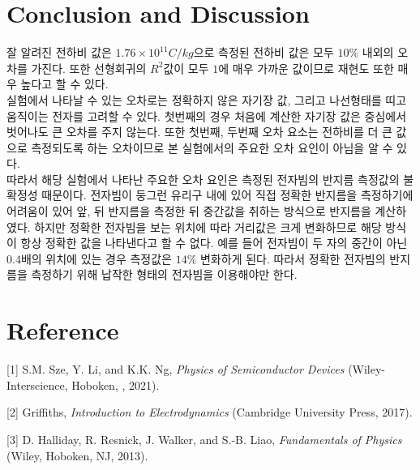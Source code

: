 \documentclass[%
 reprint,
 amsmath,amssymb,
 aps,
]{revtex4-2}
\begin{document}
\section{\label{sec:level1}Conclusion and Discussion}
잘 알려진 전하비 값은 $1.76\times 10^{11}C/kg$으로 측정된 전하비 값은 모두 $10\%$ 내외의 오차를 가진다. 또한 선형회귀의 $R^{2}$값이 모두 $1$에 매우 가까운 값이므로 재현도 또한 매우 높다고 할 수 있다.\\ 

실험에서 나타날 수 있는 오차로는 정확하지 않은 자기장 값, 그리고 나선형태를 띠고 움직이는 전자를 고려할 수 있다. 첫번째의 경우 처음에 계산한 자기장 값은 중심에서 벗어나도 큰 오차를 주지 않는다. 또한 첫번째, 두번째 오차 요소는 전하비를 더 큰 값으로 측정되도록 하는 오차이므로 본 실험에서의 주요한 오차 요인이 아님을 알 수 있다.\\

따라서 해당 실험에서 나타난 주요한 오차 요인은 측정된 전자빔의 반지름 측정값의 불확정성 때문이다. 전자빔이 둥그런 유리구 내에 있어 직접 정확한 반지름을 측정하기에 어려움이 있어 앞, 뒤 반지름을 측정한 뒤 중간값을 취하는 방식으로 반지름을 계산하였다. 하지만 정확한 전자빔을 보는 위치에 따라 거리값은 크게 변화하므로 해당 방식이 항상 정확한 값을 나타낸다고 할 수 없다. 예를 들어 전자빔이 두 자의 중간이 아닌 $0.4$배의 위치에 있는 경우 측정값은 $14\%$ 변화하게 된다. 따라서 정확한 전자빔의 반지름을 측정하기 위해 납작한 형태의 전자빔을 이용해야만 한다.

\section{\label{sec:level1}Reference}
[1] S.M. Sze, Y. Li, and K.K. Ng, \textit{Physics of Semiconductor Devices} (Wiley-Interscience, Hoboken, , 2021). 

[2] Griffiths, \textit{Introduction to Electrodynamics} (Cambridge University Press, 2017). 

[3] D. Halliday, R. Resnick, J. Walker, and S.-B. Liao, \textit{Fundamentals of Physics} (Wiley, Hoboken, NJ, 2013). 
\end{document}
